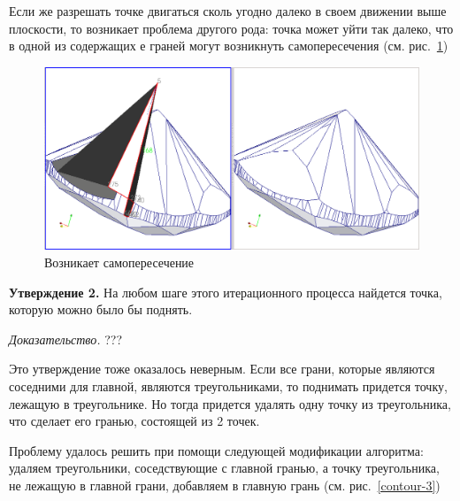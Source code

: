 \documentclass[a4paper,12pt, titlepage]{article}
\begin{document}
\begin{flushleft}
 Если же разрешать точке двигаться сколь угодно далеко в своем движении выше плоскости, то возникает проблема другого рода:
точка может уйти так далеко, что в одной из содержащих е граней могут возникнуть самопересечения (см. рис.~\ref{plane-wrong-2})
\end{flushleft}


\begin{flushleft}
  \begin{figure}[h]
    \includegraphics[width=13cm]{bugs/Plane-wrong-2.png}
    \caption{Возникает самопересечение}\label{plane-wrong-2}
  \end{figure}
\end{flushleft}

\begin{flushleft}
 \textbf{Утверждение 2.} На любом шаге этого итерационного процесса найдется точка, которую можно было
бы поднять.
\end{flushleft}

\begin{flushleft}
 \textit{Доказательство.} ???
\end{flushleft}

\begin{flushleft}
 Это утверждение тоже оказалось неверным. Если все грани, которые являются соседними для главной, являются треугольниками,
то поднимать придется точку, лежащую в треугольнике. Но тогда придется удалять одну точку из треугольника, что сделает его
гранью, состоящей из 2 точек.
\end{flushleft}


\begin{flushleft}
 Проблему удалось решить при помощи следующей модификации алгоритма: удаляем треугольники, соседствующие с главной гранью, 
а точку треугольника, не лежащую в главной грани, добавляем в главную грань (см. рис.~\ref{contour-3})
\end{flushleft}
\end{document}
